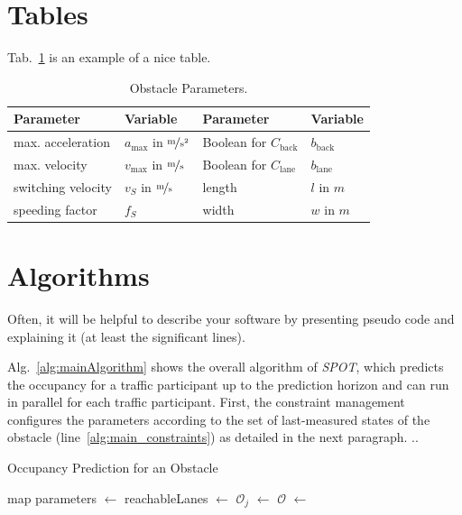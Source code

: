 \section{Tables}
Tab.~\ref{tab:parameters} is an example of a nice table.

\begin{table}[!htb]\centering
	\caption{Obstacle Parameters.}
	\begin{tabular}{@{}llll@{}} \toprule
		\textbf{Parameter} & \textbf{Variable}                       & \textbf{Parameter}            & \textbf{Variable} \\ \midrule
		max. acceleration  & $a_\mathrm{max}$ in $\unitfrac{m}{s^2}$ & Boolean for $C_\mathrm{back}$ & $b_\mathrm{back}$ \\
		max. velocity      & $v_\mathrm{max}$ in $\unitfrac{m}{s}$   & Boolean for $C_\mathrm{lane}$ & $b_\mathrm{lane}$ \\
		switching velocity & $v_S$ in $\unitfrac{m}{s}$              & length                        & $l$ in $\unit{m}$ \\
		speeding factor    & $f_S$                                   & width                         & $w$ in $\unit{m}$ \\
		\bottomrule
	\end{tabular}
	\label{tab:parameters}
\end{table}

\section{Algorithms}
Often, it will be helpful to describe your software by presenting pseudo code and explaining it (at least the significant lines).

Alg.~\ref{alg:mainAlgorithm} shows the overall algorithm of \textit{SPOT}, which predicts the occupancy for a traffic participant up to the
prediction horizon and can run in parallel for each traffic participant.
First, the constraint management configures the parameters according to the set of last-measured states of the obstacle
(line~\ref{alg:main_constraints}) as detailed in the next paragraph.
..

\begin{algorithm}
	\caption{Occupancy Prediction for an Obstacle}
	\begin{algorithmic}[1]
		\Require map
		\State parameters $\gets$  \label{alg:main_constraints}
		\State reachableLanes $\gets$  \label{alg:main_reach}
		\State $\mathcal{O}_{j}$ $\gets$ \label{alg:main_abstractions}
		\EndFor
		\State \Return $\mathcal{O}$ $\gets$  \label{alg:main_intersect}
	\end{algorithmic}
	\label{alg:mainAlgorithm}
\end{algorithm}

